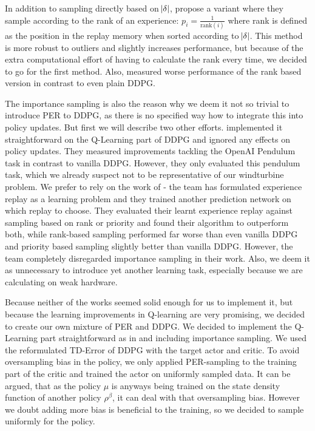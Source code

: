 \documentclass[hyperref,german,beleg]{cgvpub}
\begin{document}
In addition to sampling directly based on $\abs{\delta}$, \cite{schaulPrioritizedExperienceReplay2016} propose a variant where they sample according to the rank of an experience: $p_i = \frac{1}{\text{rank}(i)}$ where rank is defined as the position in the replay memory when sorted according to $\abs{\delta}$. This method is more robust to outliers and slightly increases performance, but because of the extra computational effort of having to calculate the rank every time, we decided to go for the first method. Also, \cite{zhaExperienceReplayOptimization2019} measured worse performance of the rank based version in contrast to even plain \ac{DDPG}.

The importance sampling is also the reason why we deem it not so trivial to introduce \ac{PER} to \ac{DDPG}, as there is no specified way how to integrate this into policy updates. But first we will describe two other efforts. \cite{houImprovingDDPGPrioritized} implemented it straightforward on the Q-Learning part of \ac{DDPG} and ignored any effects on policy updates. They measured improvements tackling the OpenAI Pendulum task in contrast to vanilla \ac{DDPG}. However, they only evaluated this pendulum task, which we already suspect not to be representative of our windturbine problem. We prefer to rely on the work of \cite{zhaExperienceReplayOptimization2019} - the team has formulated experience replay as a learning problem and they trained another prediction network on which replay to choose. They evaluated their learnt experience replay against sampling based on rank or priority and found their algorithm to outperform both, while rank-based sampling performed far worse than even vanilla \ac{DDPG} and priority based sampling slightly better than vanilla \ac{DDPG}. However, the team completely disregarded importance sampling in their work. Also, we deem it as unnecessary to introduce yet another learning task, especially because we are calculating on weak hardware.

Because neither of the works seemed solid enough for us to implement it, but because the learning improvements in Q-learning are very promising, we decided to create our own mixture of \ac{PER} and \ac{DDPG}. We decided to implement the Q-Learning part straightforward as in \cite{schaulPrioritizedExperienceReplay2016} and including importance sampling. We used the reformulated \ac{TD-Error} of \ac{DDPG} with the target actor and critic. To avoid oversampling bias in the policy, we only applied \ac{PER}-sampling to the training part of the critic and trained the actor on uniformly sampled data. It can be argued, that as the policy $\mu$ is anyways being trained on the state density function of another policy $\rho^{\beta}$, it can deal with that oversampling bias. However we doubt adding more bias is beneficial to the training, so we decided to sample uniformly for the policy.
\end{document}
